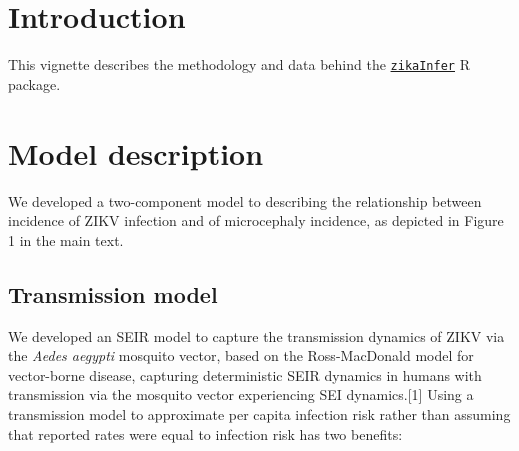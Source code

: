 \documentclass[10pt,letterpaper]{article}
\date{}
\begin{document}
\vspace*{0.2in}

\begin{flushleft}
{\Large
\textbf{} %
}
\newline
\\
\\
\bigskip
\bigskip
\end{flushleft}


\linenumbers

\section{Introduction}\label{introduction}

This vignette describes the methodology and data behind the
\href{https://github.com/jameshay218/zikaInfer}{\texttt{zikaInfer}} R
package.

\section{Model description}\label{model-description}

We developed a two-component model to describing the relationship
between incidence of ZIKV infection and of microcephaly incidence, as
depicted in Figure 1 in the main text.

\subsection{Transmission model}\label{transmission-model}

We developed an SEIR model to capture the transmission dynamics of ZIKV
via the \emph{Aedes aegypti} mosquito vector, based on the
Ross-MacDonald model for vector-borne disease, capturing deterministic
SEIR dynamics in humans with transmission via the mosquito vector
experiencing SEI dynamics.{[}1{]} Using a transmission model to
approximate per capita infection risk rather than assuming that reported
rates were equal to infection risk has two benefits:
\end{document}
